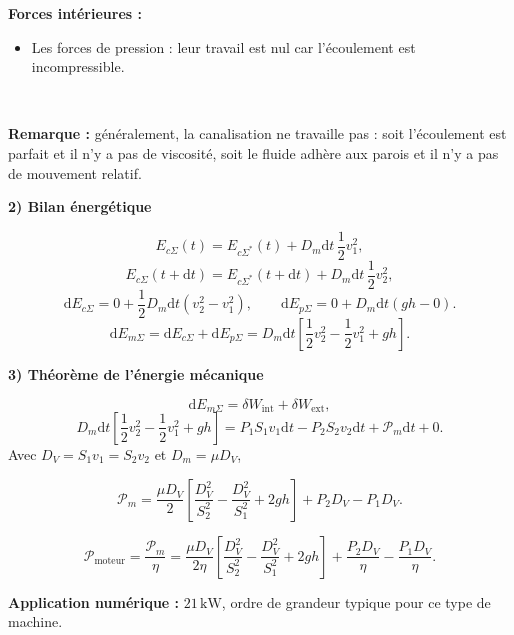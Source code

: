 \documentclass[11pt,a4paper]{article}
\newcommand{\dd}{\mathrm d}
\newcommand{\sys}{\Sigma^*}
\newcommand{\Pm}{\mathcal P_m}\newcommand{\Piint}{\mathcal P_{\mathrm{int}}}\newcommand{\Piext}{\mathcal P_{\mathrm{ext}}}
\newcommand{\etape}[1]{\par\medskip\textbf{#1}\par\nopagebreak[4]}
\begin{document}
\begin{exemple}[breakable]
\begin{minipage}{\linewidth}
\textbf{Forces intérieures :}
\begin{itemize}
\item Les forces de pression : leur travail est nul car l'écoulement est incompressible.
\end{itemize}
\end{minipage}
\\
\par \textbf{Remarque :} généralement, la canalisation ne travaille pas : soit l'écoulement est parfait et il n'y a pas de viscosité, soit le fluide adhère aux parois et il n'y a pas de mouvement relatif.
\etape{2) Bilan énergétique}
\[E_{c\Sigma}(t)=E_{c\sys}(t)+D_m\dd t\,\frac12v_1^2,\]
\[E_{c\Sigma}(t+\dd t)=E_{c\sys}(t+\dd t)+D_m\dd t\,\frac12v_2^2,\]
\[\dd E_{c\Sigma}=0+\frac12D_m\dd t(v_2^2-v_1^2),\qquad\dd E_{p\Sigma}=0+D_m\dd t(gh-0).\]
\[\dd E_{m\Sigma}=\dd E_{c\Sigma}+\dd E_{p\Sigma}=D_m\dd t\left[\frac12v_2^2-\frac12v_1^2+gh\right].\]
\etape{3) Théorème de l'énergie mécanique}
\[\dd E_{m\Sigma}=\delta W_{\mathrm{int}}+\delta W_{\mathrm{ext}},\]
\[D_m\dd t\left[\frac12v_2^2-\frac12v_1^2+gh\right]=P_1S_1v_1\dd t-P_2S_2v_2\dd t+\Pm\dd t+0.\]
Avec $D_V=S_1v_1=S_2v_2$ et $D_m=\mu D_V$,
\begin{cadre}\[\Pm=\frac{\mu D_V}{2}\left[\frac{D_V^2}{S_2^2}-\frac{D_V^2}{S_1^2}+2gh\right]+P_2D_V-P_1D_V.\]\end{cadre}
\[\mathcal P_{\mathrm{moteur}}=\frac{\Pm}{\eta}=\frac{\mu D_V}{2\eta}\left[\frac{D_V^2}{S_2^2}-\frac{D_V^2}{S_1^2}+2gh\right]+\frac{P_2D_V}{\eta}-\frac{P_1D_V}{\eta}.\]
\par\medskip\noindent\textbf{Application numérique :} $21\,\mathrm{kW}$, ordre de grandeur typique pour ce type de machine.
\end{exemple}
\end{document}
